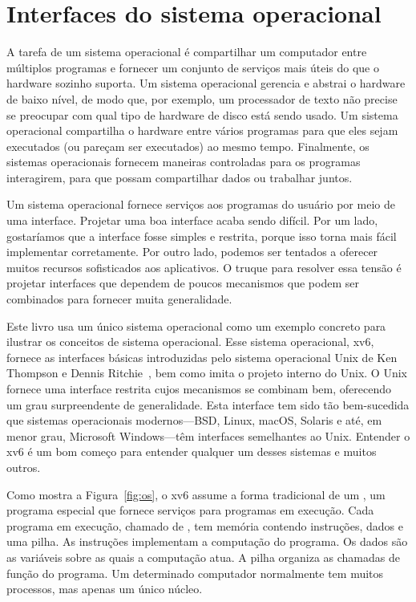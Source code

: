 \chapter{Interfaces do sistema operacional}
\label{CH:UNIX}

A tarefa de um sistema operacional é compartilhar um computador entre
múltiplos programas e fornecer um conjunto de serviços mais úteis
do que o hardware sozinho suporta.
Um sistema operacional gerencia e abstrai
o hardware de baixo nível, de modo que, por exemplo,
um processador de texto não precise se preocupar com qual tipo
de hardware de disco está sendo usado.
Um sistema operacional compartilha o hardware entre vários programas para
que eles sejam executados (ou pareçam ser executados) ao mesmo tempo.
Finalmente, os sistemas operacionais fornecem maneiras controladas para os programas
interagirem, para que possam compartilhar dados ou trabalhar juntos.

Um sistema operacional fornece serviços aos programas do usuário por meio de uma interface.
Projetar uma boa interface  acaba sendo
difícil. Por um lado, gostaríamos que a interface fosse
simples e restrita, porque isso torna mais fácil implementar corretamente.  Por outro lado,
podemos ser tentados a oferecer muitos recursos sofisticados aos aplicativos.
O truque para
resolver essa tensão é projetar interfaces que dependem de poucos
mecanismos que podem ser combinados para fornecer muita generalidade.

Este livro usa um único sistema operacional como um exemplo concreto para
ilustrar os conceitos de sistema operacional.  Esse sistema operacional,
xv6, fornece as interfaces básicas introduzidas pelo sistema operacional Unix de Ken Thompson e
Dennis Ritchie~\cite{unix}, bem como imita o
projeto interno do Unix.  O Unix fornece uma
interface restrita cujos mecanismos se combinam bem, oferecendo um grau surpreendente de
generalidade.  Esta interface tem sido tão bem-sucedida que
sistemas operacionais modernos—BSD, Linux, macOS, Solaris e até, em
menor grau, Microsoft Windows—têm interfaces semelhantes ao Unix.
Entender o xv6 é um bom começo para entender qualquer um desses
sistemas e muitos outros.

Como
mostra a Figura~\ref{fig:os},
o xv6 assume a forma tradicional de um
,
um programa especial que fornece
serviços para programas em execução.
Cada programa em execução, chamado de
,
tem memória contendo instruções, dados e uma pilha. As
instruções implementam a
computação do programa.  Os dados são as variáveis sobre as quais
a computação atua. A pilha organiza as chamadas de função do programa.
Um determinado computador normalmente tem muitos processos, mas apenas um único
núcleo.

